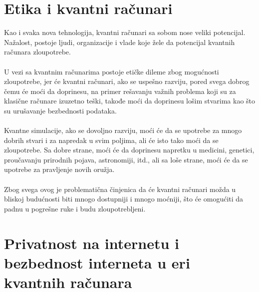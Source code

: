 \documentclass[fleqn, 12pt]{article}
\begin{document}
\newpage

\section{Etika i kvantni računari}

\begin{text}
Kao i svaka nova tehnologija, kvantni računari sa sobom nose veliki potencijal. Nažalost, postoje ljudi, organizacije i vlade koje žele da potencijal kvantnih računara zloupotrebe.
\\\\

U vezi sa kvantnim računarima postoje etičke dileme zbog mogućnosti zloupotrebe, jer će kvantni računari, ako se uspešno razviju, pored svega dobrog čemu će moći da doprinesu, na primer rešavanju važnih problema koji su za klasične računare izuzetno teški, takođe moći da doprinesu lošim stvarima kao što su urušavanje bezbednosti podataka.
\\\\

Kvantne simulacije, ako se dovoljno razviju, moći će da se upotrebe za mnogo dobrih stvari i za napredak u svim poljima, ali će isto tako moći da se zloupotrebe. Sa dobre strane, moći će da doprinesu napretku u medicini, genetici, proučavanju prirodnih pojava, astronomiji, itd., ali sa loše strane, moći će da se upotrebe za pravljenje novih oružja.
\\\\

Zbog svega ovog je problematična činjenica da će kvantni računari možda u bliskoj budućnosti biti mnogo dostupniji i mnogo moćniji, što će omogućiti da padnu u pogrešne ruke i budu zloupotrebljeni.
\end{text}

\newpage

\section{Privatnost na internetu i bezbednost interneta u eri kvantnih računara}
\end{document}
